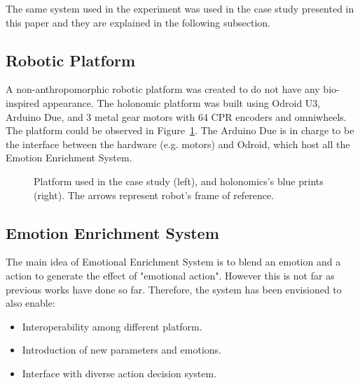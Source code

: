 The same system used in the experiment was used in the case study presented in this paper and they are explained in the following subsection. 

\subsection{Robotic Platform}

A non-anthropomorphic robotic platform was created to do not have any bio-inspired appearance. The holonomic platform was built using Odroid U3, Arduino Due, and 3 metal gear motors with 64 CPR encoders and omniwheels. The platform could be observed in Figure~\ref{fig:Robot}. The Arduino Due is in charge to be the interface between the hardware (e.g. motors) and Odroid, which host all the Emotion Enrichment System.

\begin{figure}[t]
\centering%
\hspace{2mm}
\caption{Platform used in the case study (left), and holonomics's blue prints (right). The arrows represent robot's frame of reference.
\label{fig:Robot}}
\end{figure}

\subsection{Emotion Enrichment System}

The main idea of Emotional Enrichment System is to blend an emotion and a action to generate the effect of "emotional action". However this is not far as previous works have done so far. Therefore, the system has been envisioned to also enable:

\begin{itemize}
	\item Interoperability among different platform.
	\item Introduction of new parameters and emotions.
	\item Interface with diverse action decision system.
\end{itemize}

